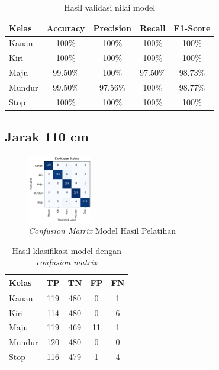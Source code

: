 \begin{longtable}{|l|c|c|c|c|}
  \caption{Hasil validasi nilai model}
  \label{tb:vs_model5} \\
  \hline
  \rowcolor[HTML]{C0C0C0} 
  \textbf{Kelas} & \textbf{Accuracy} & \textbf{Precision} & \textbf{Recall} & \textbf{F1-Score} \\ \hline
  Kanan    & 100\%            & 100\%             & 100\%           & 100\%            \\ \hline
  Kiri     & 100\%          & 100\%           & 100\%           & 100\%           \\ \hline
  Maju      & 99.50\%          & 100\%           & 97.50\%          & 98.73\%          \\ \hline
  Mundur     & 99.50\%            & 97.56\%             & 100\%           & 98.77\%            \\ \hline
  Stop  & 100\%            & 100\%             & 100\%           & 100\%            \\ \hline
\end{longtable}

\subsection{Jarak 110 cm}

\begin{figure} [ht] \centering
  \includegraphics[width=0.25\textwidth]{gambar/bab4/model5 (30cm)/110cm/matrix.png}
  \caption{\emph{Confusion Matrix} Model Hasil Pelatihan}
  \label{fig:matrix6}
\end{figure}

\begin{longtable}{|l|c|c|c|c|}
  \caption{Hasil klasifikasi model dengan \emph{confusion matrix}}
  \label{tb:cm_model6} \\
  \hline
  \rowcolor[HTML]{C0C0C0} 
  \textbf{Kelas} & \textbf{TP} & \textbf{TN} & \textbf{FP} & \textbf{FN} \\ \hline
  Kanan    & 119          & 480         & 0           & 1           \\ \hline
  Kiri      & 114          & 480         & 0           & 6           \\ \hline
  Maju      & 119          & 469         & 11           & 1           \\ \hline
  Mundur     & 120          & 480         & 0           & 0           \\ \hline
  Stop  & 116          & 479         & 1           & 4           \\ \hline
\end{longtable}


